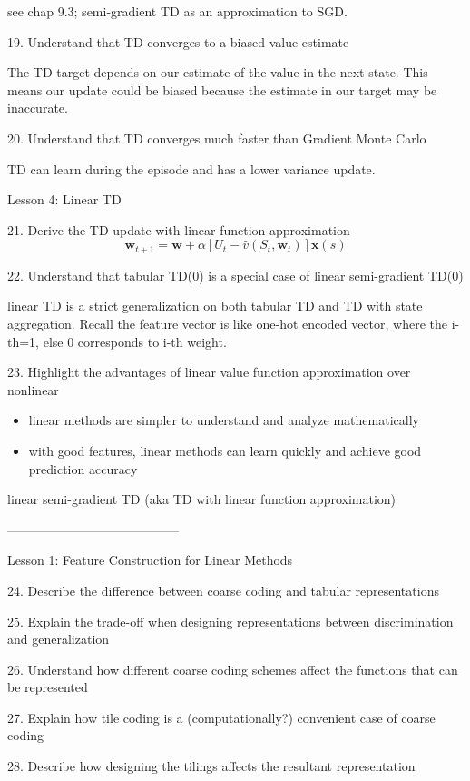 \documentclass[sutton_barto_notes.tex]{subfiles}
\begin{document}
see chap 9.3; semi-gradient TD as an approximation to SGD.

19. Understand that TD converges to a biased value estimate 

The TD target depends on our estimate of the value in the next state. This means our update could be biased because the estimate in our target may be inaccurate.

20. Understand that TD converges much faster than Gradient Monte Carlo 

TD can learn during the episode and has a lower variance update.

Lesson 4: Linear TD 

21. Derive the TD-update with linear function approximation 
$$\bm{w}_{t+1} = \bm{w} + \alpha[U_t - \hat{v}(S_t, \bm{w}_t)]\bm{x}(s)$$

22. Understand that tabular TD(0) is a special case of linear semi-gradient TD(0)

linear TD is a strict generalization on both tabular TD and TD with state aggregation. Recall the feature vector is like one-hot encoded vector, where the i-th=1, else 0 corresponds to i-th weight. 

23. Highlight the advantages of linear value function approximation over nonlinear 

\begin{itemize}
\item linear methods are simpler to understand and analyze mathematically
\item with good features, linear methods can learn quickly and achieve good prediction accuracy
\end{itemize}

linear semi-gradient TD (aka TD with linear function approximation)

-----------------------------------------

Lesson 1: Feature Construction for Linear Methods 

24. Describe the difference between coarse coding and tabular representations 

25. Explain the trade-off when designing representations between discrimination and generalization 

26. Understand how different coarse coding schemes affect the functions that can be represented 

27. Explain how tile coding is a (computationally?) convenient case of coarse coding 

28. Describe how designing the tilings affects the resultant representation 
\end{document}
